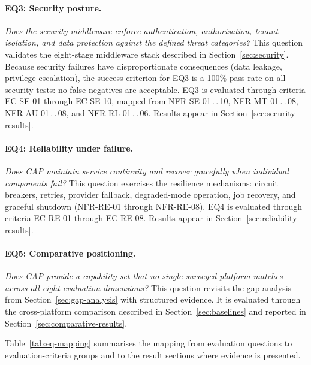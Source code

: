 \documentclass[a4paper,noexaminfo]{sapthesis}
\begin{document}
\paragraph{EQ3: Security posture.}
\emph{Does the security middleware enforce authentication, authorisation,
tenant isolation, and data protection against the defined threat
categories?}
This question validates the eight-stage middleware stack described in
Section~\ref{sec:security}.  Because security failures have
disproportionate consequences (data leakage, privilege escalation), the
success criterion for EQ3 is a 100\% pass rate on all security tests: no
false negatives are acceptable.  EQ3 is evaluated through criteria
EC-SE-01 through EC-SE-10, mapped from NFR-SE-01\,.\,.\,10,
NFR-MT-01\,.\,.\,08, NFR-AU-01\,.\,.\,08, and NFR-RL-01\,.\,.\,06.
Results appear in Section~\ref{sec:security-results}.

\paragraph{EQ4: Reliability under failure.}
\emph{Does CAP maintain service continuity and recover gracefully when
individual components fail?}
This question exercises the resilience mechanisms: circuit breakers,
retries, provider fallback, degraded-mode operation, job recovery, and
graceful shutdown (NFR-RE-01 through NFR-RE-08).  EQ4 is evaluated
through criteria EC-RE-01 through EC-RE-08.  Results appear in
Section~\ref{sec:reliability-results}.

\paragraph{EQ5: Comparative positioning.}
\emph{Does CAP provide a capability set that no single surveyed platform
matches across all eight evaluation dimensions?}
This question revisits the gap analysis from Section~\ref{sec:gap-analysis}
with structured evidence.  It is evaluated through the cross-platform
comparison described in Section~\ref{sec:baselines} and reported in
Section~\ref{sec:comparative-results}.

\medskip

Table~\ref{tab:eq-mapping} summarises the mapping from evaluation
questions to evaluation-criteria groups and to the result sections where
evidence is presented.
\end{document}
